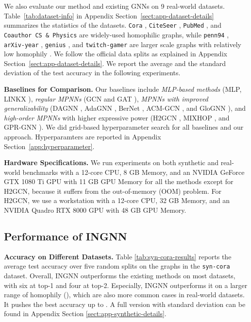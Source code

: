 \documentclass{article}
\theoremstyle{plain}
\newcommand{\pjn}{{INGNN}}
\begin{document}
We also evaluate our method and existing GNNs on 9 real-world datasets. 
Table~\ref{tab:dataset-info} in Appendix Section~\ref{sect:app-dataset-details} summarizes the statistics of the datasets. 
\texttt{Cora} \cite{sen2008collective}, \texttt{CiteSeer} \cite{sen2008collective}, \texttt{PubMed} \cite{sen2008collective}, and \texttt{Coauthor CS \& Physics} \cite{shchur2018pitfalls} are widely-used homophilic graphs, while \texttt{penn94} \cite{traud2012social}, \texttt{arXiv-year} \cite{hu2020open}, \texttt{genius} \cite{lim2021expertise}, and \texttt{twitch-gamer} \cite{rozemberczki2021twitch} are larger scale graphs with relatively low homophily \cite{lim2021new,lim2021large}. 
We follow the official data splits as explained in Appendix Section~\ref{sect:app-dataset-details}. We report the average and the standard deviation of the test accuracy in the following experiments.

\textbf{Baselines for Comparison.}
Our baselines include \textit{MLP-based methods} (MLP, LINKX \cite{lim2021large}), \textit{regular MPNNs} (GCN \cite{kipf2016semi} and GAT \cite{velivckovic2017graph}), \textit{MPNNs with improved generalizability} (DAGNN \cite{liu2020towards}, AdaGNN \cite{dong2021adagnn}, BerNet \cite{he2021bernnet}, ACM-GCN \cite{luan2022revisiting}, and GloGNN \cite{li2022finding}), and \textit{high-order MPNNs} with higher expressive power (H2GCN \cite{zhu2020beyond}, MIXHOP \cite{abu2019mixhop}, and GPR-GNN \cite{chien2020adaptive}). 
We did grid-based hyperparameter search for all baselines and our approach. Hyperparamters are reported in  Appendix Section~\ref{app:hyperparameter}. 

\textbf{Hardware Specifications.} We run experiments on both synthetic and real-world benchmarks with a 12-core CPU, 8 GB Memory, and an NVIDIA GeForce GTX 1080 Ti GPU with 11 GB GPU Memory for all the methods except for H2GCN, because it suffers from the out-of-memory (OOM) problem. For H2GCN, we use a workstation with a 12-core CPU, 32 GB Memory, and an NVIDIA Quadro RTX 8000 GPU with 48 GB GPU Memory.





\subsection{Performance of INGNN} \label{sec:Results}
\textbf{Accuracy on Different Datasets.}
Table \ref{tab:syn-cora-results} reports the average test accuracy over five random splits on the graphs in the \texttt{syn-cora} dataset. 
Overall, \pjn{} outperforms the existing methods on most datasets, with six at top-1 and four at top-2. Especially, \pjn{} outperforms it on a larger range of homophily (), which are also more common cases in real-world datasets. It pushes the best accuracy up to . A full version with standard deviation can be found in Appendix Section \ref{sect:app-synthetic-details}. 
\end{document}
